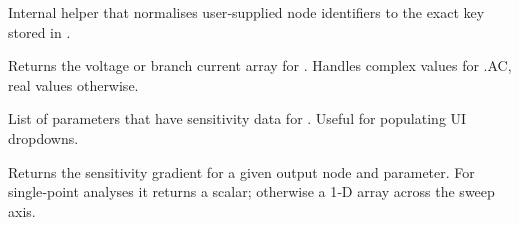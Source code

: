 \documentclass[letterpaper,10pt,english]{sphinxmanual}
\begin{document}
\begin{fulllineitems}
\begin{fulllineitems}
\label{\detokenize{results:SimulationResult._resolve_node_key}}
\pysigstartsignatures
\pysiglinewithargsret
{}
{}
{}
\pysigstopsignatures
\sphinxAtStartPar
Internal helper that normalises user‑supplied node identifiers
to the exact key stored in {\hyperref[\detokenize{results:SimulationResult.node_map}]{}}.

\end{fulllineitems}


\begin{fulllineitems}
\label{\detokenize{results:SimulationResult.get_voltage}}
\pysigstartsignatures
\pysiglinewithargsret
{}
{}
{}
\pysigstopsignatures
\sphinxAtStartPar
Returns the voltage or branch current array for .
Handles complex values for .AC, real values otherwise.

\end{fulllineitems}


\begin{fulllineitems}
\label{\detokenize{results:SimulationResult.get_sensitivity_parameters}}
\pysigstartsignatures
\pysiglinewithargsret
{}
{}
{}
\pysigstopsignatures
\sphinxAtStartPar
List of parameters that have sensitivity data for .
Useful for populating UI dropdowns.

\end{fulllineitems}


\begin{fulllineitems}
\label{\detokenize{results:SimulationResult.get_sensitivity}}
\pysigstartsignatures
\pysiglinewithargsret
{}
{\sphinxparamcomma {}}
{}
\pysigstopsignatures
\sphinxAtStartPar
Returns the sensitivity gradient for a given output node and parameter.
For single‑point analyses it returns a scalar; otherwise a 1‑D array
across the sweep axis.

\end{fulllineitems}


\end{fulllineitems}
\end{document}
